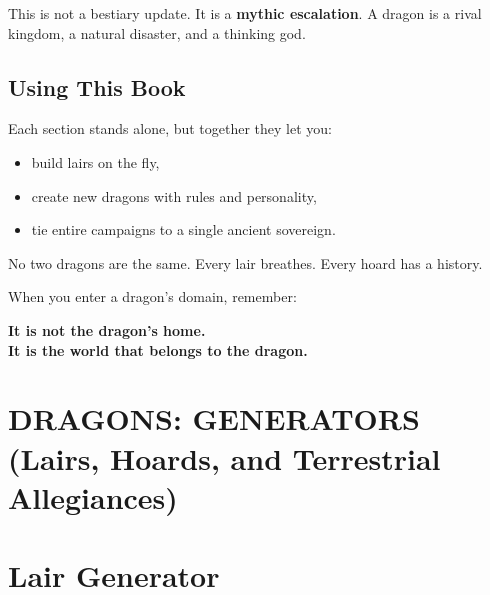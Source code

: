\documentclass[11pt,letterpaper]{article}
\newcommand{\subsectionheader}[1]{\subsection*{#1}}
\begin{document}
This is not a bestiary update. It is a \textbf{mythic escalation}.  
A dragon is a rival kingdom, a natural disaster, and a thinking god.

\subsectionheader{Using This Book}

Each section stands alone, but together they let you:
\begin{itemize}[leftmargin=*]
\item build lairs on the fly,
\item create new dragons with rules and personality,
\item tie entire campaigns to a single ancient sovereign.
\end{itemize}

No two dragons are the same.  
Every lair breathes.  
Every hoard has a history.

When you enter a dragon's domain, remember:

\begin{center}
\textbf{It is not the dragon's home.}\\
\textbf{It is the world that belongs to the dragon.}
\end{center}

\newpage



\section*{DRAGONS: GENERATORS (Lairs, Hoards, and Terrestrial Allegiances)}



\section{Lair Generator}
\end{document}
